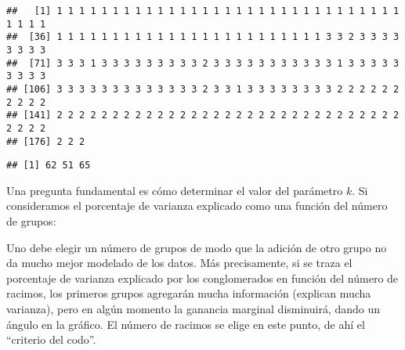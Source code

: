 \documentclass[]{article}
\newenvironment{Shaded}{\begin{snugshade}}{\end{snugshade}}
\newcommand{\KeywordTok}[1]{\textcolor[rgb]{0.13,0.29,0.53}{\textbf{{#1}}}}
\newcommand{\DataTypeTok}[1]{\textcolor[rgb]{0.13,0.29,0.53}{{#1}}}
\newcommand{\DecValTok}[1]{\textcolor[rgb]{0.00,0.00,0.81}{{#1}}}
\newcommand{\StringTok}[1]{\textcolor[rgb]{0.31,0.60,0.02}{{#1}}}
\newcommand{\NormalTok}[1]{{#1}}
\numberwithin{equation}{section}
\begin{document}
\begin{verbatim}
##   [1] 1 1 1 1 1 1 1 1 1 1 1 1 1 1 1 1 1 1 1 1 1 1 1 1 1 1 1 1 1 1 1 1 1 1 1
##  [36] 1 1 1 1 1 1 1 1 1 1 1 1 1 1 1 1 1 1 1 1 1 1 1 1 3 3 2 3 3 3 3 3 3 3 3
##  [71] 3 3 3 1 3 3 3 3 3 3 3 3 3 2 3 3 3 3 3 3 3 3 3 3 3 1 3 3 3 3 3 3 3 3 3
## [106] 3 3 3 3 3 3 3 3 3 3 3 3 3 2 3 3 1 3 3 3 3 3 3 3 3 2 2 2 2 2 2 2 2 2 2
## [141] 2 2 2 2 2 2 2 2 2 2 2 2 2 2 2 2 2 2 2 2 2 2 2 2 2 2 2 2 2 2 2 2 2 2 2
## [176] 2 2 2
\end{verbatim}

\begin{verbatim}
## [1] 62 51 65
\end{verbatim}

Una pregunta fundamental es cómo determinar el valor del parámetro
\(k\). Si consideramos el porcentaje de varianza explicado como una
función del número de grupos:

Uno debe elegir un número de grupos de modo que la adición de otro grupo
no da mucho mejor modelado de los datos. Más precisamente, si se traza
el porcentaje de varianza explicado por los conglomerados en función del
número de racimos, los primeros grupos agregarán mucha información
(explican mucha varianza), pero en algún momento la ganancia marginal
disminuirá, dando un ángulo en la gráfico. El número de racimos se elige
en este punto, de ahí el ``criterio del codo''.

\begin{Shaded}
\end{Shaded}
\end{document}
